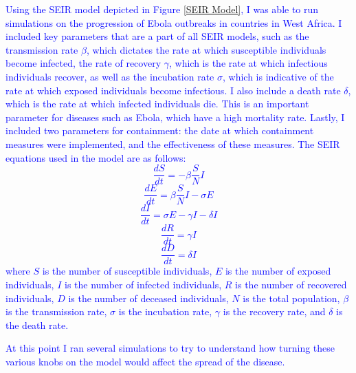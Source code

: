\documentclass[%
 reprint,
superscriptaddress,
 amsmath,amssymb,
 aps,
]{revtex4-2}
\begin{document}
\textcolor{blue}{Using the SEIR model depicted in Figure \ref{SEIR Model}, I was able to run simulations on the progression of Ebola outbreaks in countries in West Africa. I included key parameters that are a part of all SEIR models, such as the transmission rate $\beta$, which dictates the rate at which susceptible individuals become infected, the rate of recovery $\gamma$, which is the rate at which infectious individuals recover, as well as the incubation rate $\sigma$, which is indicative of the rate at which exposed individuals become infectious.
I also include a death rate $\delta$, which is the rate at which infected individuals die. This is an important parameter for diseases such as Ebola, which have a high mortality rate.
Lastly, I included two parameters for containment: the date at which containment measures were implemented, and the effectiveness of these measures.}
\textcolor{blue}{The SEIR equations used in the model are as follows:
\begin{equation}
    \frac{dS}{dt} = -\beta \frac{S}{N} I
    \label{dSdt}
\end{equation}
\begin{equation}
    \frac{dE}{dt} = \beta \frac{S}{N} I - \sigma E
    \label{dEdt}
\end{equation}
\begin{equation}
    \frac{dI}{dt} = \sigma E - \gamma I - \delta I
    \label{dIdt}
\end{equation}
\begin{equation}
    \frac{dR}{dt} = \gamma I
    \label{dRdt}
\end{equation}
\begin{equation}
    \frac{dD}{dt} = \delta I
    \label{dDdt}
\end{equation}
where $S$ is the number of susceptible individuals, $E$ is the number of exposed individuals, $I$ is the number of infected individuals, $R$ is the number of recovered individuals, $D$ is the number of deceased individuals, $N$ is the total population, $\beta$ is the transmission rate, $\sigma$ is the incubation rate, $\gamma$ is the recovery rate, and $\delta$ is the death rate.}

\textcolor{blue}{At this point I ran several simulations to try to understand how turning these various knobs on the model would affect the spread of the disease.}
\end{document}
